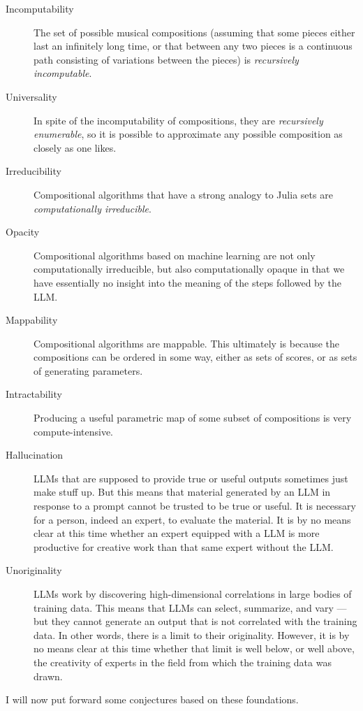 \documentclass[11pt]{scrartcl}
\begin{document}
\begin{description}
\item[Incomputability] The set of possible musical compositions (assuming that some pieces either last an infinitely long time, or that between any two pieces is a continuous path consisting of variations between the pieces) is \emph{recursively incomputable}.
\item[Universality] In spite of the incomputability of compositions, they are \emph{recursively enumerable}, so it is possible to approximate any possible composition as closely as one likes.
\item[Irreducibility] Compositional algorithms that have a strong analogy to Julia sets are \emph{computationally irreducible}.
\item[Opacity] Compositional algorithms based on machine learning are not only computationally irreducible, but also computationally opaque in that we have essentially no insight into the meaning of the steps followed by the LLM.
\item[Mappability] Compositional algorithms are mappable. This ultimately is because the compositions can be ordered in some way, either as sets of scores, or as sets of generating parameters.
\item[Intractability] Producing a useful parametric map of some subset of compositions is very compute-intensive. 
\item[Hallucination] LLMs that are supposed to provide true or useful outputs sometimes just make stuff up. But this means that material generated by an LLM in response to a prompt cannot be trusted to be true or useful. It is necessary for a person, indeed an expert, to evaluate the material. It is by no means clear at this time whether an expert equipped with a LLM is more productive for creative work than that same expert without the LLM.
\item[Unoriginality] LLMs work by discovering high-dimensional correlations in large bodies of training data. This means that LLMs can select, summarize, and vary --- but they cannot generate an output that is not correlated with the training data. In other words, there is a limit to their originality. However, it is by no means clear at this time whether that limit is well below, or well above, the creativity of experts in the field from which the training data was drawn.
\end{description}

I will now put forward some conjectures based on these foundations.
\end{document}
